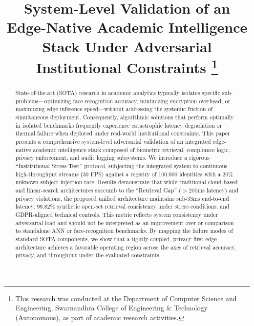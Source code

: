 \documentclass[conference]{IEEEtran}
\begin{document}
\title{System-Level Validation of an Edge-Native Academic Intelligence Stack Under Adversarial Institutional Constraints
\thanks{This research was conducted at the Department of Computer Science and Engineering, Swarnandhra College of Engineering \& Technology (Autonomous), as part of academic research activities.}
}

\author{
}

\maketitle

\begin{abstract}
State-of-the-art (SOTA) research in academic analytics typically isolates specific sub-problems---optimizing face recognition accuracy, minimizing encryption overhead, or maximizing edge inference speed---without addressing the systemic friction of simultaneous deployment. Consequently, algorithmic solutions that perform optimally in isolated benchmarks frequently experience catastrophic latency degradation or thermal failure when deployed under real-world institutional constraints. This paper presents a comprehensive system-level adversarial validation of an integrated edge-native academic intelligence stack composed of biometric retrieval, compliance logic, privacy enforcement, and audit logging subsystems. We introduce a rigorous ``Institutional Stress Test'' protocol, subjecting the integrated system to continuous high-throughput streams (30 FPS) against a registry of 100,000 identities with a 20\% unknown-subject injection rate. Results demonstrate that while traditional cloud-based and linear-search architectures succumb to the ``Retrieval Gap'' ($>200$ms latency) and privacy violations, the proposed unified architecture maintains sub-33ms end-to-end latency, 99.82\% synthetic open-set retrieval consistency under stress conditions, and GDPR-aligned technical controls. This metric reflects system consistency under adversarial load and should not be interpreted as an improvement over or comparison to standalone ANN or face-recognition benchmarks. By mapping the failure modes of standard SOTA components, we show that a tightly coupled, privacy-first edge architecture achieves a favorable operating region across the axes of retrieval accuracy, privacy, and throughput under the evaluated constraints.
\end{abstract}
\end{document}
